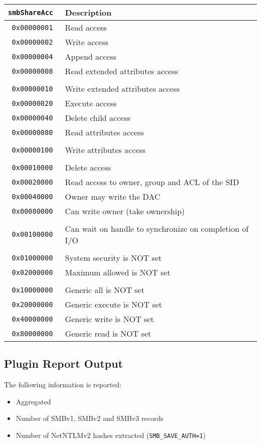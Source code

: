 \documentclass[documentation]{subfiles}
\begin{document}
\begin{longtable}{>{\tt}rl}
    \toprule
    {\bf smbShareAcc} & {\bf Description}\\
    \midrule\endhead%
    0x00000001 & Read access\\
    0x00000002 & Write access\\
    0x00000004 & Append access\\
    0x00000008 & Read extended attributes access\\
    \\
    0x00000010 & Write extended attributes access\\
    0x00000020 & Execute access\\
    0x00000040 & Delete child access\\
    0x00000080 & Read attributes access\\
    \\
    0x00000100 & Write attributes access\\
    \\
    0x00010000 & Delete access\\
    0x00020000 & Read access to owner, group and ACL of the SID\\
    0x00040000 & Owner may write the DAC\\
    0x00080000 & Can write owner (take ownership)\\
    \\
    0x00100000 & Can wait on handle to synchronize on completion of I/O\\
    \\
    0x01000000 & System security is NOT set\\
    0x02000000 & Maximum allowed is NOT set\\
    \\
    0x10000000 & Generic all is NOT set\\
    0x20000000 & Generic execute is NOT set\\
    0x40000000 & Generic write is NOT set\\
    0x80000000 & Generic read is NOT set\\
    \bottomrule
\end{longtable}

\subsection{Plugin Report Output}
The following information is reported:
\begin{itemize}
    \item Aggregated {\tt{}}
    \item Number of SMBv1, SMBv2 and SMBv3 records
    \item Number of NetNTLMv2 hashes extracted ({\tt SMB\_SAVE\_AUTH=1})
\end{itemize}
\end{document}
